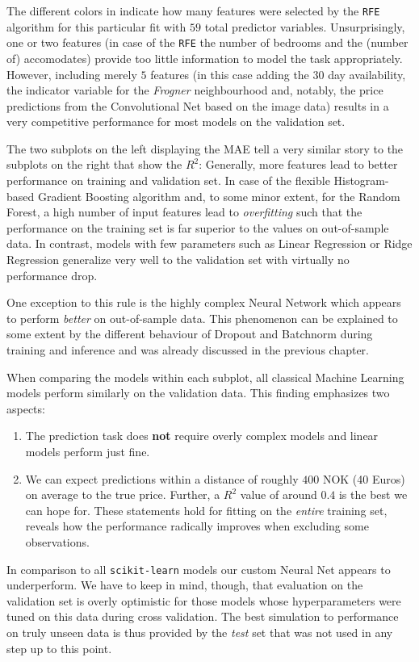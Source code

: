 The different colors in  indicate how many features were selected by the \texttt{RFE} algorithm for this particular fit with $59$ total predictor variables.
Unsurprisingly, one or two features (in case of the \texttt{RFE} the number of bedrooms and the (number of) accomodates) provide too little information to model the task appropriately.
However, including merely $5$ features (in this case adding the $30$ day availability, the indicator variable for the \emph{Frogner} neighbourhood and, notably, the price predictions from the Convolutional Net based on the image data) results in a very competitive performance for most models on the validation set.

The two subplots on the left displaying the MAE tell a very similar story to the subplots on the right that show the $R^2$:
Generally, more features lead to better performance on training and validation set.
In case of the flexible Histogram-based Gradient Boosting algorithm and, to some minor extent, for the Random Forest, a high number of input features lead to \emph{overfitting} such that the performance on the training set is far superior to the values on out-of-sample data.
In contrast, models with few parameters such as Linear Regression or Ridge Regression generalize very well to the validation set with virtually no performance drop.

One exception to this rule is the highly complex Neural Network which appears to perform \emph{better} on out-of-sample data.
This phenomenon can be explained to some extent by the different behaviour of Dropout and Batchnorm during training and inference and was already discussed in the previous chapter.

When comparing the models within each subplot, all classical Machine Learning models perform similarly on the validation data.
This finding emphasizes two aspects:
\begin{enumerate}
  \item The prediction task does \textbf{not} require overly complex models and linear models perform just fine.
  \item We can expect predictions within a distance of roughly $400$ NOK (40 Euros) on average to the true price.
        Further, a $R^2$ value of around $0.4$ is the best we can hope for.
        These statements hold for fitting on the \emph{entire} training set,  reveals how the performance radically improves when excluding some observations.
\end{enumerate}
In comparison to all \texttt{scikit-learn} models our custom Neural Net appears to underperform.
We have to keep in mind, though, that evaluation on the validation set is overly optimistic for those models whose hyperparameters were tuned on this data during cross validation.
The best simulation to performance on truly unseen data is thus provided by the \emph{test} set that was not used in any step up to this point.

